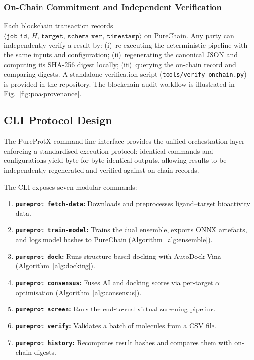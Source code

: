 \documentclass[conference]{IEEEtran}
\begin{document}
\subsubsection{On-Chain Commitment and Independent Verification}

Each blockchain transaction records
$\langle\texttt{job\_id},\, H,\, \texttt{target},\,
\texttt{schema\_ver},\, \texttt{timestamp}\rangle$
on PureChain.
Any party can independently verify a result by:
(i)~re-executing the deterministic pipeline with the
same inputs and configuration; (ii)~regenerating the
canonical JSON and computing its SHA-256 digest locally;
(iii)~querying the on-chain record and comparing digests.
A standalone verification script (\texttt{tools/verify\_onchain.py})
is provided in the repository.
The blockchain audit workflow is illustrated in
Fig.~\ref{fig:poa-provenance}.

\subsection{\textbf{CLI Protocol Design}}
\label{clidesign}

The PureProtX command-line interface provides the unified
orchestration layer enforcing a standardised execution
protocol: identical commands and configurations yield
byte-for-byte identical outputs, allowing results to be
independently regenerated and verified against on-chain
records.

The CLI exposes seven modular commands:
\begin{enumerate}
    \item \textbf{\texttt{pureprot fetch-data}:}
    Downloads and preprocesses ligand--target bioactivity data.
    \item \textbf{\texttt{pureprot train-model}:}
    Trains the dual ensemble, exports ONNX artefacts,
    and logs model hashes to PureChain
    (Algorithm~\ref{alg:ensemble}).
    \item \textbf{\texttt{pureprot dock}:}
    Runs structure-based docking with AutoDock Vina
    (Algorithm~\ref{alg:docking}).
    \item \textbf{\texttt{pureprot consensus}:}
    Fuses AI and docking scores via per-target $\alpha$
    optimisation (Algorithm~\ref{alg:consensus}).
    \item \textbf{\texttt{pureprot screen}:}
    Runs the end-to-end virtual screening pipeline.
    \item \textbf{\texttt{pureprot verify}:}
    Validates a batch of molecules from a CSV file.
    \item \textbf{\texttt{pureprot history}:}
    Recomputes result hashes and compares them with
    on-chain digests.
\end{enumerate}
\end{document}
